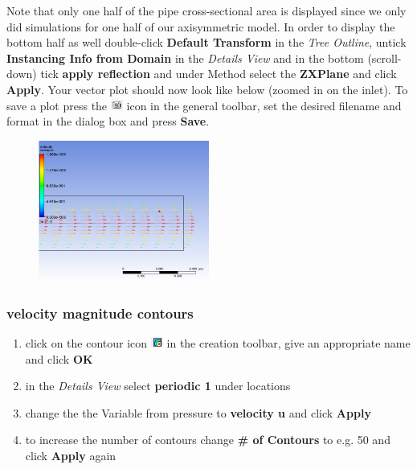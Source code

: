 \documentclass[11pt,a4paper,oneside,hidelinks]{scrartcl}
\newcommand\bfr[1]{\textcolor[rgb]{1,0.00,0.00}{\textbf{\textsf{#1}}}}
\begin{document}
Note that only one half of the pipe cross-sectional area is displayed since we only did simulations for one half of our axisymmetric model. In order to display the bottom half as well double-click \bfr{Default Transform} in the \emph{Tree Outline},  untick \bfr{Instancing Info from Domain} in the \emph{Details View} and in the bottom (scroll-down) tick \bfr{apply reflection} and under Method select the \bfr{ZXPlane} and click \bfr{Apply}. Your vector plot  should now look like below (zoomed in on the inlet). To save a plot press the \includegraphics[width=0.4cm]{save_picture_icon.png} icon in the general toolbar, set the desired filename and format in the dialog box and press \bfr{Save}.

\begin{figure}[H]
\begin{center}
\includegraphics[width=0.5\textwidth,clip]{vector_plot.png}
\end{center}
\end{figure}

\subsubsection{velocity magnitude contours}\label{sec:velcontour}

\begin{enumerate}
\item click on the contour icon \includegraphics[width=0.4cm]{contour_icon.png} in the creation toolbar, give an appropriate name and click \bfr{OK}
\item in the \emph{Details View} select \bfr{periodic 1} under locations
\item change the the Variable from pressure to \bfr{velocity u} and click \bfr{Apply}
\item to increase the number of contours change \bfr{\# of Contours} to e.g. 50 and click \bfr{Apply} again
\end{enumerate}
\end{document}
